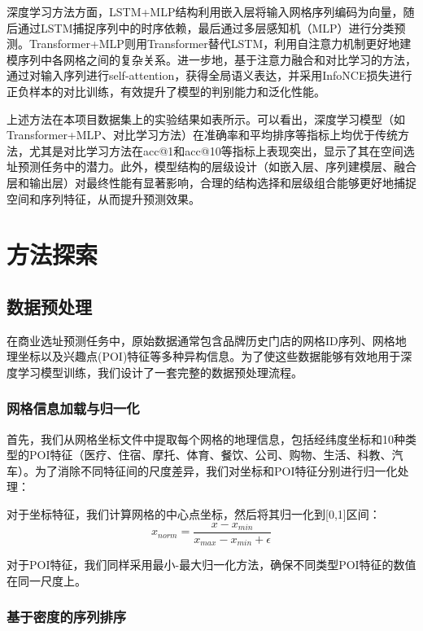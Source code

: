 \documentclass{article}
\begin{document}
深度学习方法方面，LSTM+MLP结构利用嵌入层将输入网格序列编码为向量，随后通过LSTM捕捉序列中的时序依赖，最后通过多层感知机（MLP）进行分类预测。Transformer+MLP则用Transformer替代LSTM，利用自注意力机制更好地建模序列中各网格之间的复杂关系。进一步地，基于注意力融合和对比学习的方法，通过对输入序列进行self-attention，获得全局语义表达，并采用InfoNCE损失进行正负样本的对比训练，有效提升了模型的判别能力和泛化性能。

上述方法在本项目数据集上的实验结果如表所示。可以看出，深度学习模型（如Transformer+MLP、对比学习方法）在准确率和平均排序等指标上均优于传统方法，尤其是对比学习方法在acc@1和acc@10等指标上表现突出，显示了其在空间选址预测任务中的潜力。此外，模型结构的层级设计（如嵌入层、序列建模层、融合层和输出层）对最终性能有显著影响，合理的结构选择和层级组合能够更好地捕捉空间和序列特征，从而提升预测效果。


\section{方法探索}

\subsection{数据预处理}

在商业选址预测任务中，原始数据通常包含品牌历史门店的网格ID序列、网格地理坐标以及兴趣点(POI)特征等多种异构信息。为了使这些数据能够有效地用于深度学习模型训练，我们设计了一套完整的数据预处理流程。

\subsubsection{网格信息加载与归一化}

首先，我们从网格坐标文件中提取每个网格的地理信息，包括经纬度坐标和10种类型的POI特征（医疗、住宿、摩托、体育、餐饮、公司、购物、生活、科教、汽车）。为了消除不同特征间的尺度差异，我们对坐标和POI特征分别进行归一化处理：

对于坐标特征，我们计算网格的中心点坐标，然后将其归一化到[0,1]区间：
\begin{equation}
x_{norm} = \frac{x - x_{min}}{x_{max} - x_{min} + \epsilon}
\end{equation}

对于POI特征，我们同样采用最小-最大归一化方法，确保不同类型POI特征的数值在同一尺度上。

\subsubsection{基于密度的序列排序}
\end{document}
